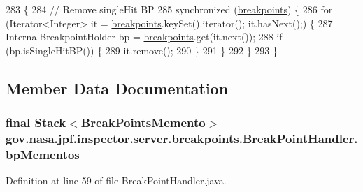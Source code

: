 \begin{DoxyCode}
283                                              \{
284     \textcolor{comment}{// Remove singleHit BP}
285     \textcolor{keyword}{synchronized} (\hyperlink{classgov_1_1nasa_1_1jpf_1_1inspector_1_1server_1_1breakpoints_1_1_break_point_handler_a034265be2e9419b28fa12d1b860295df}{breakpoints}) \{
286       \textcolor{keywordflow}{for} (Iterator<Integer> it = \hyperlink{classgov_1_1nasa_1_1jpf_1_1inspector_1_1server_1_1breakpoints_1_1_break_point_handler_a034265be2e9419b28fa12d1b860295df}{breakpoints}.keySet().iterator(); it.hasNext();) \{
287         InternalBreakpointHolder bp = \hyperlink{classgov_1_1nasa_1_1jpf_1_1inspector_1_1server_1_1breakpoints_1_1_break_point_handler_a034265be2e9419b28fa12d1b860295df}{breakpoints}.get(it.next());
288         \textcolor{keywordflow}{if} (bp.isSingleHitBP()) \{
289           it.remove();
290         \}
291       \}
292     \}
293   \}
\end{DoxyCode}


\subsection{Member Data Documentation}
\subsubsection[{\texorpdfstring{bp\+Mementos}{bpMementos}}]{\setlength{\rightskip}{0pt plus 5cm}final Stack$<${\bf Break\+Points\+Memento}$>$ gov.\+nasa.\+jpf.\+inspector.\+server.\+breakpoints.\+Break\+Point\+Handler.\+bp\+Mementos\hspace{0.3cm}{\ttfamily [private]}}\hypertarget{classgov_1_1nasa_1_1jpf_1_1inspector_1_1server_1_1breakpoints_1_1_break_point_handler_a8126a85baf407a92fa5369202d966408}{}\label{classgov_1_1nasa_1_1jpf_1_1inspector_1_1server_1_1breakpoints_1_1_break_point_handler_a8126a85baf407a92fa5369202d966408}


Definition at line 59 of file Break\+Point\+Handler.\+java.

